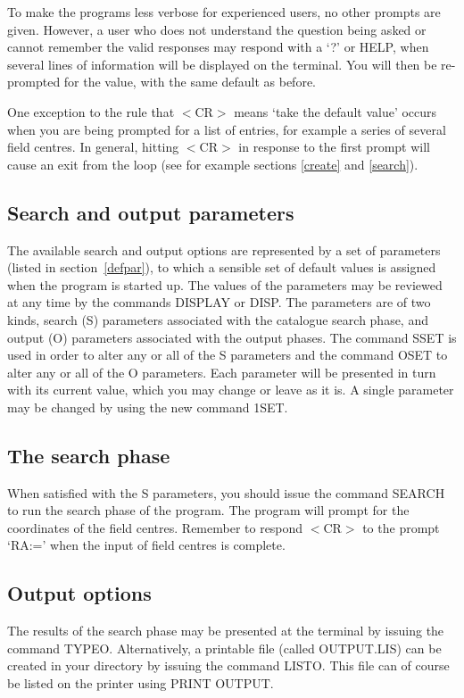 To make the programs less verbose for experienced users, no other prompts are
given.
However, a user who does not understand the question being asked or cannot
remember the valid responses may respond with a `?' or HELP, when several lines
of information will be displayed on the terminal.
You will then be re-prompted for the value, with the same default as before.

One exception to the rule that $<$CR$>$ means `take the default value' occurs
when you are being prompted for a list of entries, for example a series of
several field centres. In general, hitting $<$CR$>$ in response to the first
prompt will cause an exit from the loop (see for example sections \ref{create}
and \ref{search}). 

\subsection{Search and output parameters}
The available search and output options are represented by a set of parameters
(listed in section~\ref{defpar}), to which a sensible set of default values 
is assigned when the program is started up.
The values of the parameters may be reviewed at any time by the commands DISPLAY
or DISP.
The parameters are of two kinds, search (S) parameters associated with the
catalogue search phase, and output (O) parameters associated with the output
phases.
The command SSET is used in order to alter any or all of the S parameters and
the command OSET to alter any or all of the O parameters.
Each parameter will be presented in turn with its current value, which you may
change or leave as it is.
A single parameter may be changed by using the new command 1SET.
\subsection{The search phase}
When satisfied with the S parameters, you should issue the command SEARCH to run
the search phase of the program.
The program will prompt for the coordinates of the field centres.
Remember to respond $<$CR$>$ to the prompt `RA:=' when the input of field
centres is complete. 
\subsection{Output options}
The results of the search phase may be presented at the terminal by issuing the
command TYPEO.
Alternatively, a printable file (called OUTPUT.LIS) can be created in your
directory by issuing the command LISTO.
This file can of course be listed on the printer using PRINT OUTPUT.

